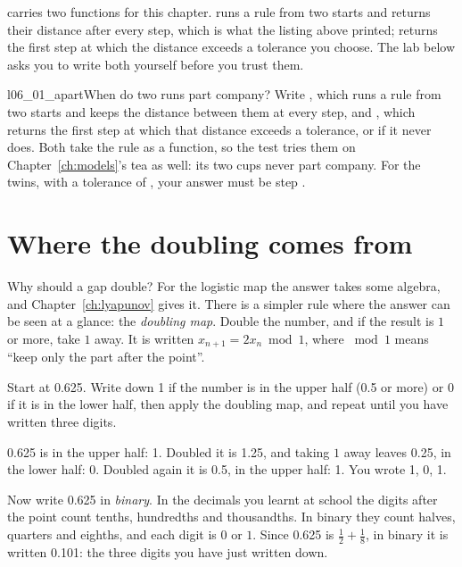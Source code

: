 
\begin{projectbox}
 carries two functions for this chapter.  runs
a rule from two starts and returns their distance after every step, which is
what the listing above printed;  returns the first
step at which the distance exceeds a tolerance you choose. The lab below
asks you to write both yourself before you trust them.
\end{projectbox}

\begin{lab}{l06_01_apart}{When do two runs part company?}
Write , which runs a rule from two starts and keeps the distance
between them at every step, and , which returns the first
step at which that distance exceeds a tolerance, or  if it never
does. Both take the rule as a function, so the test tries them on
Chapter~\ref{ch:models}'s tea as well: its two cups never part company. For the twins, with a
tolerance of , your answer must be step .
\end{lab}

\section{Where the doubling comes from}
\label{sec:ch06-digits}

\noindent
Why should a gap double? For the logistic map the answer takes some algebra,
and Chapter~\ref{ch:lyapunov} gives it. There is a simpler rule where the
answer can be seen at a glance: the \emph{doubling map}. Double the number,
and if the result is $1$ or more, take $1$ away. It is written
$x_{n+1} = 2x_n \bmod 1$, where $\bmod 1$ means \enquote{keep only the part
after the point}.

\begin{think}
Start at \num{0.625}. Write down 1 if the number is in the upper half
(\num{0.5} or more) or 0 if it is in the lower half, then apply the doubling
map, and repeat until you have written three digits.
\end{think}
\begin{revealblock}
\num{0.625} is in the upper half: 1. Doubled it is \num{1.25}, and taking $1$
away leaves \num{0.25}, in the lower half: 0. Doubled again it is \num{0.5},
in the upper half: 1. You wrote 1, 0, 1.
\end{revealblock}
Now write \num{0.625} in \emph{binary}. In the decimals you learnt at school
the digits after the point count tenths, hundredths and thousandths. In
binary they count halves, quarters and eighths, and each digit is $0$ or
$1$. Since \num{0.625} is $\tfrac12 + \tfrac18$, in binary it is written
\num{0.101}: the three digits you have just written down.

